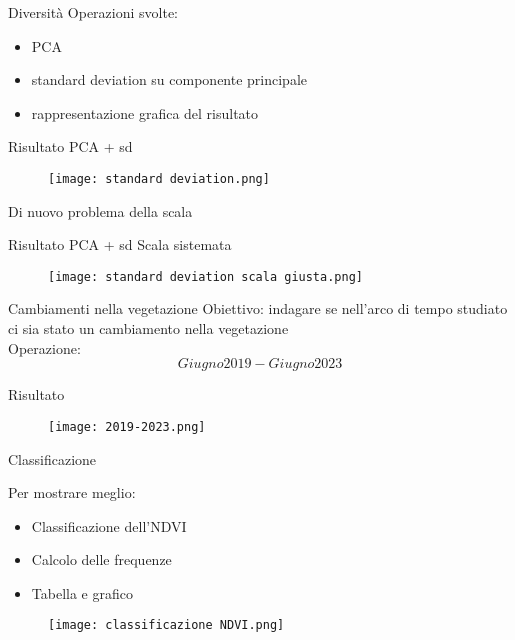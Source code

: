 \documentclass{beamer} %
\begin{document}
\begin{frame}{Diversità}
Operazioni svolte: 
	\begin{itemize}
		\item PCA
		\item standard deviation su componente principale 
		\item rappresentazione grafica del risultato
	\end{itemize}
\end{frame}


\begin{frame}{Risultato PCA + sd}
	\begin{figure}
		\centering
		\texttt{[image: standard deviation.png]}
		\label{fig:enter-label}
	\end{figure}
\centering 
Di nuovo problema della scala 
\end{frame}


\begin{frame}{Risultato PCA + sd}
Scala sistemata
	\begin{figure}
		\centering
		\texttt{[image: standard deviation scala giusta.png]}
  		\label{fig:enter-label}
	\end{figure}
\end{frame}


\begin{frame}{Cambiamenti nella vegetazione}
Obiettivo: indagare se nell'arco di tempo studiato ci sia stato un cambiamento nella vegetazione \\
Operazione: 
	\begin{equation}
		Giugno 2019 - Giugno 2023
  	\end{equation}
\end{frame}


\begin{frame}{Risultato}
	\begin{figure}
		\centering
		\texttt{[image: 2019-2023.png]}
  		\label{fig:enter-label}
	\end{figure} 
\end{frame}


\begin{frame}{Classificazione}
\begin{multicols}{2}
Per mostrare meglio: 
	\begin{itemize}
		\item Classificazione dell'NDVI
		\item Calcolo delle frequenze
		\item Tabella e grafico 
  	\end{itemize}
\columnbreak
	\begin{figure}
		\centering
		\texttt{[image: classificazione NDVI.png]}
  		\label{fig:enter-label}
	\end{figure}
\end{multicols}
\end{frame}
\end{document}
